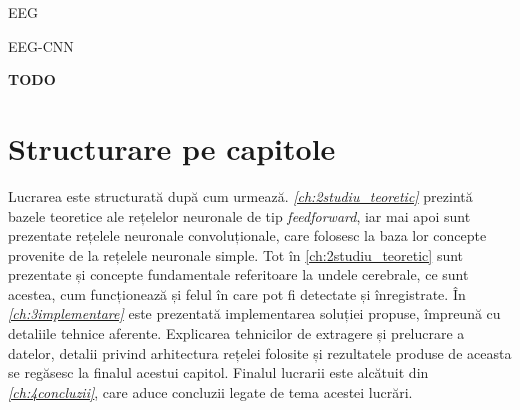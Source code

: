 EEG\cite{eeg:2018}

EEG-CNN\cite{eeg-cnn:2020}

\textbf{TODO}

\section{Structurare pe capitole}
Lucrarea este structurată după cum urmează. \textit{\autoref{ch:2studiu_teoretic}} prezintă bazele teoretice ale rețelelor neuronale de tip \textit{feedforward}, iar mai apoi sunt prezentate rețelele neuronale convoluționale, care folosesc la baza lor concepte provenite de la rețelele neuronale simple. Tot în \autoref{ch:2studiu_teoretic} sunt prezentate și concepte fundamentale referitoare la undele cerebrale, ce sunt acestea, cum funcționează și felul în care pot fi detectate și înregistrate. În \textit{\autoref{ch:3implementare}} este prezentată implementarea soluției propuse, împreună cu detaliile tehnice aferente. Explicarea tehnicilor de extragere și prelucrare a datelor, detalii privind arhitectura rețelei folosite și rezultatele produse de aceasta se regăsesc la finalul acestui capitol. Finalul lucrarii este alcătuit din \textit{\autoref{ch:4concluzii}}, care aduce concluzii legate de tema acestei lucrări.